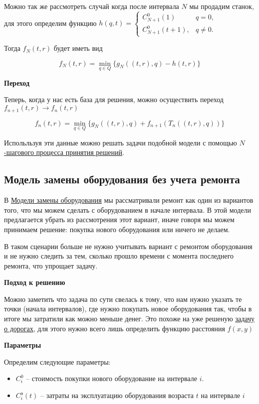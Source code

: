 Можно так же рассмотреть случай когда после интервала $N$ мы продадим станок, для этого определим функцию $h(q, t) = \begin{cases}
	C_{N+1}^0 (1) & q = 0, \\
	C_{N+1}^0 (t+1), & q \neq 0.
\end{cases}$

Тогда $f_N(t, r)$ будет иметь вид

\[
\boxed{ f_N(t,r) = \min_{q \in Q} \Big\{ g_N((t,r), q) - h(t,r) \Big\} }
\]

\bigskip

\textbf{Переход}

Теперь, когда у нас есть база для решения, можно осуществить переход $f_{n+1}(t, r) \to f_n(t, r)$

\[
\boxed{ f_n(t,r) = \min_{q \in Q} \Big\{ g_N((t,r), q) + f_{n+1}(T_n((t,r), q)) \Big\} }
\]

Испольльзуя эти данные можно решать задачи подобной модели с помощью \hyperref[alg:n_step_process]{$N$-шагового процесса принятия решений}.

\subsection{Модель замены оборудования без учета ремонта}

В \hyperref[pr:equipment_replacement_model]{Модели замены оборудования} мы рассматривали ремонт как один из вариантов того, что мы можем сделать с оборудованием в начале интервала. В этой модели предлагается убрать из рассмотрения этот вариант, иначе говоря мы можем принимаем решение: покупка нового оборудования или ничего не делаем.

В таком сценарии больше не нужно учитывать вариант с ремонтом оборудования и не нужно следить за тем, сколько прошло времени с момента последнего ремонта, что упрощает задачу.

\bigskip

\textbf{Подход к решению}

Можно заметить что задача по сути свелась к тому, что нам нужно указать те точки (начала интервалов), где нужно покупать новое оборудования так, чтобы в итоге мы затратили как можно меньше денег. Это похоже на уже решеную \hyperref[pr:road]{задачу о дорогах}, для этого нужно всего лишь определить функцию расстояния $f(x, y)$

\textbf{Параметры}

Определим следующие параметры:
\begin{itemize}[nosep]
	\item $C_i^0$ -- стоимость покупки нового оборудование на интервале $i$.
	\item $C_i^\text{э} (t)$ -- затраты на эксплуатацию оборудования возраста $t$ на интервале $i$
\end{itemize}

